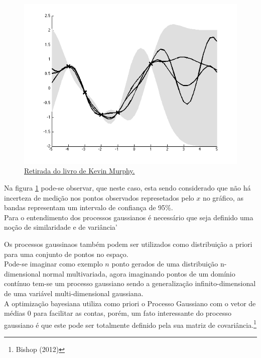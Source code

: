 \documentclass[
	12pt,				%
	twoside,		%
	a4paper,		%
	chapter=TITLE,		   %
	section=TITLE,		   %
	subsection=TITLE,	   %
	subsubsection=TITLE, %
	english,			%
	french,				%
	spanish,			%
	brazil,				%
]{abntex2}
\begin{document}
\begin{figure}
\centering
\includegraphics[width=\textwidth,height=0.3\textheight]{images/gp.png}
\caption{\href{https://github.com/probml/pmtk3/blob/30d7a1952f3979b16e92dbfa4cd1ce0e402cf7d8/docs/demoOutput/bookDemos/(15)-Gaussian_processes/gprDemoNoiseFree_02.png}{Retirada
do livro de Kevin Murphy.\label{gp}}}
\end{figure}

Na figura \ref{gp} pode-se observar, que neste caso, esta sendo
considerado que não há incerteza de medição nos pontos observados
represetados pelo \(x\) no gráfico, as bandas representam um intervalo
de confiança de 95\%.\\

Para o entendimento dos processos gaussianos é necessário que seja
definido uma noção de similaridade e de variância'

Os processos gaussinaos também podem ser utilizados como distribuição a
priori para uma conjunto de pontos no espaço.\\

Pode-se imaginar como exemplo \(n\) ponto gerados de uma distribuição
n-dimensional normal multivariada, agora imaginando pontos de um domínio
contínuo tem-se um processo gaussiano sendo a generalização
infinito-dimensional de uma variável multi-dimensional gaussiana.\\

A optimização bayesiana utiliza como priori o Processo Gaussiano com o
vetor de médias 0 para facilitar as contas, porém, um fato interessante
do processo gaussiano é que este pode ser totalmente definido pela sua
matriz de covariância.\footnote{Bishop (2012)}\\
\end{document}
